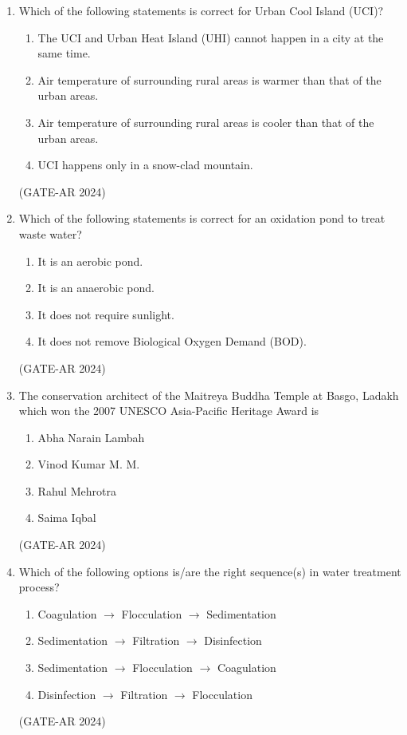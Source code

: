 \documentclass[a4paper,10pt]{article}
\begin{document}
\begin{enumerate}
    \item Which of the following statements is correct for Urban Cool Island (UCI)?
    \begin{enumerate}
        \item The UCI and Urban Heat Island (UHI) cannot happen in a city at the same time.
        \item Air temperature of surrounding rural areas is warmer than that of the urban areas.
        \item Air temperature of surrounding rural areas is cooler than that of the urban areas.
        \item UCI happens only in a snow-clad mountain.
    \end{enumerate}
    \hfill (GATE-AR 2024)

    \item Which of the following statements is correct for an oxidation pond to treat waste water?
    \begin{enumerate}
        \item It is an aerobic pond.
        \item It is an anaerobic pond.
        \item It does not require sunlight.
        \item It does not remove Biological Oxygen Demand (BOD).
    \end{enumerate}
    \hfill (GATE-AR 2024)

    \item The conservation architect of the Maitreya Buddha Temple at Basgo, Ladakh which won the 2007 UNESCO Asia-Pacific Heritage Award is
    \begin{multicols}{2}
    \begin{enumerate}
        \item Abha Narain Lambah
        \item Vinod Kumar M. M.
        \item Rahul Mehrotra
        \item Saima Iqbal
    \end{enumerate}
    \end{multicols}
    \hfill (GATE-AR 2024)

    \item Which of the following options is/are the right sequence(s) in water treatment process?
    \begin{enumerate}
        \item Coagulation $\to$ Flocculation $\to$ Sedimentation
        \item Sedimentation $\to$ Filtration $\to$ Disinfection
        \item Sedimentation $\to$ Flocculation $\to$ Coagulation
        \item Disinfection $\to$ Filtration $\to$ Flocculation
    \end{enumerate}
    \hfill (GATE-AR 2024)


\end{enumerate}
\end{document}
